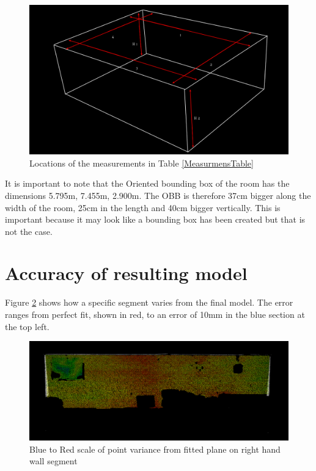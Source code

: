 		
		\begin{figure}[H]
			\centering
			\includegraphics[width=0.7\linewidth]{Includes/images/Results/Selection_013}
			\caption{Locations of the measurements in Table \ref{MeasurmensTable}}
			\label{fig:SourceOfMEasure}
		\end{figure}
		
		\noindent It is important to note that the Oriented bounding box of the room has the dimensions 5.795m, 7.455m, 2.900m. The OBB is therefore 37cm bigger along the width of the room, 25cm in the length and 40cm bigger vertically. This is important because it may look like a bounding box has been created but that is not the case.
		
	\section{Accuracy of resulting model}
		Figure \ref{fig:Planefitingaccuracy} shows how a specific segment varies from the final model. The error ranges from perfect fit, shown in red, to an error of 10mm in the blue section at the top left. 
		
		\begin{figure}[H]
		\centering
		\includegraphics[width=1\linewidth]{"Includes/images/Results/Plane fiting accuracy"}
		\caption{Blue to Red scale of point variance from fitted plane on right hand wall segment }
		\label{fig:Planefitingaccuracy}
		\end{figure}
		
